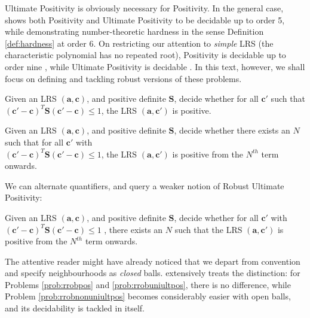 Ultimate Positivity is obviously necessary for Positivity. In the general case, \cite{joeljames3} shows both Positivity and Ultimate Positivity to be decidable up to order 5, while demonstrating number-theoretic hardness in the sense Definition \ref{def:hardness} at order $6$. On restricting our attention to \textit{simple} LRS (the characteristic polynomial has no repeated root), Positivity is decidable up to order nine \cite{ouaknine2014positivity}, while Ultimate Positivity is decidable \cite{ouaknine2014ultimate}. In this text, however, we shall focus on defining and tackling robust versions of these problems.

\begin{problem}
\label{prob:rrobpos}
Given an LRS $(\mathbf{a}, \mathbf{c})$, and positive definite $\mathbf{S}$, decide whether for all $\mathbf{c'}$ such that $(\mathbf{c'} - \mathbf{c})^T\mathbf{S}(\mathbf{c'} - \mathbf{c}) \le 1$, the LRS $(\mathbf{a}, \mathbf{c'})$ is positive.
\end{problem}

\begin{problem}
\label{prob:rrobuniultpos}
Given an LRS $(\mathbf{a}, \mathbf{c})$, and positive definite $\mathbf{S}$, decide whether there exists an $N$ such that for all $\mathbf{c'}$ with\\ $(\mathbf{c'} - \mathbf{c})^T\mathbf{S}(\mathbf{c'} - \mathbf{c}) \le 1$, the LRS $(\mathbf{a}, \mathbf{c'})$ is positive from the $N^{th}$ term onwards.
\end{problem}

We can alternate quantifiers, and query a weaker notion of Robust Ultimate Positivity:
\begin{problem}
\label{prob:rrobnonuniultpos}
Given an LRS $(\mathbf{a}, \mathbf{c})$, and positive definite $\mathbf{S}$, decide whether for all $\mathbf{c'}$ with $(\mathbf{c'} - \mathbf{c})^T\mathbf{S}(\mathbf{c'} - \mathbf{c}) \le 1$ , there exists an $N$ such that the LRS $(\mathbf{a}, \mathbf{c'})$ is positive from the $N^{th}$ term onwards.
\end{problem}

The attentive reader might have already noticed that we depart from convention and specify neighbourhoods as \textit{closed} balls. \cite{originalarxiv} extensively treats the distinction: for Problems \ref{prob:rrobpos} and \ref{prob:rrobuniultpos}, there is no difference, while Problem \ref{prob:rrobnonuniultpos} becomes considerably easier with open balls, and its decidability is tackled in \cite{originalarxiv} itself.

